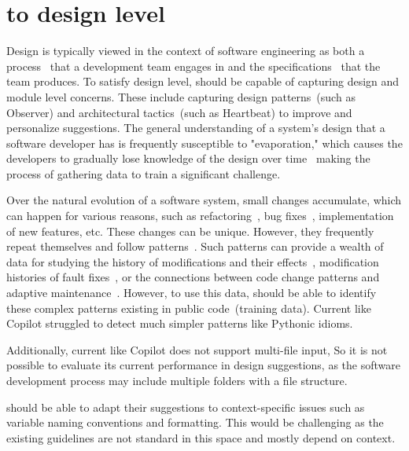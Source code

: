 \section{\cct{} to design level}
\label{cs2design}
Design is typically viewed in the context of software engineering as both a process~\cite{design} that a development team engages in and the specifications~\cite{designdef} that the team produces. 
To satisfy design level, \cct{} should be capable of capturing design and module level concerns. 
These include capturing design patterns~(such as Observer) and architectural tactics~(such as Heartbeat) to improve and personalize suggestions.
The general understanding of a system's design that a software developer has is frequently susceptible to "evaporation," which causes the developers to gradually lose knowledge of the design over time~\cite{martinse} making the process of gathering data to train \cct{} a significant challenge.

Over the natural evolution of a software system, small changes accumulate, which can happen for various reasons, such as refactoring~\cite{fabio}, bug fixes~\cite{cotroneo}, implementation of new features, etc.
These changes can be unique. However, they frequently repeat themselves and follow patterns~\cite{changes}. 
Such patterns can provide a wealth of data for studying the history of modifications and their effects~\cite{martinchanges}, modification histories of fault fixes~\cite{daniel}, or the connections between code change patterns and adaptive maintenance~\cite{ijece}.
However, to use this data, \cct{} should be able to identify these complex patterns existing in public code~(training data). Current \cct{} like Copilot struggled to detect much simpler patterns like Pythonic idioms.

Additionally, current \cct{} like Copilot does not support multi-file input, So it is not possible to evaluate its current performance in design suggestions, as the software development process may include multiple folders with a file structure. 

\cct{} should be able to adapt their suggestions to context-specific issues such as variable naming conventions and formatting. 
This would be challenging as the existing guidelines are not standard in this space and mostly depend on context.

